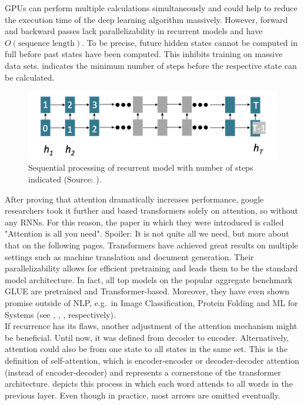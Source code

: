 \documentclass[
]{krantz}
\begin{document}
GPUs can perform multiple calculations simultaneously and could help to
reduce the execution time of the deep learning algorithm massively.
However, forward and backward passes lack parallelizability in recurrent
models and have \(O(\text{sequence length})\). To be precise, future hidden states
cannot be computed in full before past states have been computed. This
inhibits training on massive data sets. indicates the minimum number of
steps before the respective state can be calculated.

\begin{figure}

{\centering \includegraphics[width=0.7\linewidth]{./figures/01-01-nlp/transformer_rnnlim2_stanford} 

}

\caption{Sequential processing of recurrent model with number of steps indicated (Source: \citet{Manning2022}).}\label{fig:tfrnnlim2stanford}
\end{figure}



After proving that attention dramatically increases performance, google
researchers took it further and based transformers solely on attention,
so without any RNNs. For this reason, the paper in which they were
introduced is called "Attention is all you need". Spoiler: It is not
quite all we need, but more about that on the following pages.
Transformers have achieved great results on multiple settings such as
machine translation and document generation. Their parallelizability
allows for efficient pretraining and leads them to be the standard model
architecture. In fact, all top models on the popular aggregate benchmark
GLUE are pretrained and Transformer-based. Moreover, they have even
shown promise outside of NLP, e.g.~in Image Classification, Protein
Folding and ML for Systems (see \citet{dosovitskiy2020image}, \citet{Jumper2021},
\citet{Zhou2020}, respectively).\\

If recurrence has its flaws, another adjustment of the attention
mechanism might be beneficial. Until now, it was defined from decoder to
encoder. Alternatively, attention could also be from one state to all
states in the same set. This is the definition of self-attention, which
is encoder-encoder or decoder-decoder attention (instead of
encoder-decoder) and represents a cornerstone of the transformer
architecture. depicts this process in which each word attends to all
words in the previous layer. Even though in practice, most arrows are
omitted eventually.\\
\end{document}
